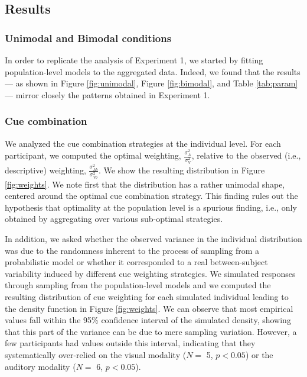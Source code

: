 \documentclass[english,,man,floatsintext]{apa6}
\theoremstyle{definition}
\theoremstyle{definition}
\theoremstyle{definition}
\theoremstyle{remark}
\begin{document}
\subsection{Results}\label{results-2}

\subsubsection{Unimodal and Bimodal
conditions}\label{unimodal-and-bimodal-conditions}

In order to replicate the analysis of Experiment 1, we started by
fitting population-level models to the aggregated data. Indeed, we found
that the results --- as shown in Figure \ref{fig:unimodal}, Figure
\ref{fig:bimodal}, and Table \ref{tab:param} --- mirror closely the
patterns obtained in Experiment 1.

\subsubsection{Cue combination}\label{cue-combination-3}

We analyzed the cue combination strategies at the individual level. For
each participant, we computed the optimal weighting,
\(\frac{\sigma^2_{A}}{\sigma^2_{V}}\), relative to the observed (i.e.,
descriptive) weighting, \(\frac{\sigma^2_{Ab}}{\sigma^2_{Vb}}\). We show
the resulting distribution in Figure \ref{fig:weights}. We note first
that the distribution has a rather unimodal shape, centered around the
optimal cue combination strategy. This finding rules out the hypothesis
that optimality at the population level is a spurious finding, i.e.,
only obtained by aggregating over various sub-optimal strategies.

In addition, we asked whether the observed variance in the individual
distribution was due to the randomness inherent to the process of
sampling from a probabilistic model or whether it corresponded to a real
between-subject variability induced by different cue weighting
strategies. We simulated responses through sampling from the
population-level models and we computed the resulting distribution of
cue weighting for each simulated individual leading to the density
function in Figure \ref{fig:weights}. We can observe that most empirical
values fall within the 95\% confidence interval of the simulated
density, showing that this part of the variance can be due to mere
sampling variation. However, a few participants had values outside this
interval, indicating that they systematically over-relied on the visual
modality (\(N=\) 5, \(p < 0.05\)) or the auditory modality (\(N=\) 6,
\(p < 0.05\)).
\end{document}
